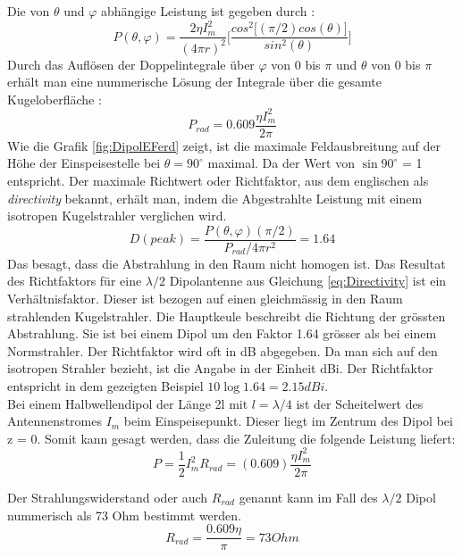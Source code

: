 Die von $\theta$ und $\varphi$ abhängige Leistung ist gegeben durch \cite{elliott1981antenna}:
\begin{equation}
P(\theta,\varphi)=\frac{2\eta I_{m}^{2}}{(4\pi r)^{2}}\lbrack \frac{cos^{2}\lbrack (\pi/2) cos(\theta)\rbrack}{sin^{2}(\theta)}\rbrack
\end{equation}
Durch das Auflösen der Doppelintegrale über $\varphi$ von 0 bis $\pi$  und $\theta$ von 0 bis $\pi$ erhält man eine nummerische Lösung der Integrale über die gesamte Kugeloberfläche \cite{elliott1981antenna}:
\begin{equation}
P_{rad}=0.609 \frac{\eta I_{m}^{2}}{2\pi}
\end{equation}
Wie die  Grafik \ref{fig:DipolEFerd} zeigt, ist die maximale Feldausbreitung auf der Höhe der Einspeisestelle bei $\theta = 90 ^\circ $ maximal.  Da der Wert von  $\sin90^\circ  $ = 1 entspricht.
Der maximale Richtwert oder Richtfaktor,  aus dem englischen als \textit{directivity} bekannt, erhält man, indem die Abgestrahlte Leistung mit einem isotropen Kugelstrahler verglichen wird\cite{elliott1981antenna}.
\begin{equation}
D(peak)=\frac{P(\theta,\varphi)(\pi/2)}{P_{rad}/ 4 \pi r^{2}} =1.64
\label{eq:Directivity}
\end{equation}
Das besagt, dass die Abstrahlung in den Raum nicht homogen ist. Das Resultat des Richtfaktors für eine $\lambda /2$ Dipolantenne aus Gleichung \ref{eq:Directivity} ist ein Verhältnisfaktor. Dieser ist bezogen auf einen gleichmässig in den Raum strahlenden Kugelstrahler. Die Hauptkeule beschreibt die Richtung der grössten Abstrahlung. Sie ist bei einem Dipol um den Faktor 1.64 grösser als bei einem Normstrahler. Der Richtfaktor wird oft in dB abgegeben. Da man sich auf den isotropen Strahler bezieht, ist die Angabe in der Einheit dBi. Der Richtfaktor entspricht in dem gezeigten Beispiel $10\log{1.64}=2.15dBi$.\\

Bei einem Halbwellendipol der Länge 2l mit $l=\lambda/4 $ ist der Scheitelwert des Antennenstromes $I_{m}$ beim Einspeisepunkt. Dieser liegt im Zentrum des Dipol bei z = 0. Somit kann gesagt werden, dass die Zuleitung  die folgende Leistung  liefert:
\begin{equation}
P=\frac{1}{2} I_{m}^{2}R_{rad}=(0.609)\frac{\eta I_{m}^{2}}{2\pi}
\end{equation}

Der Strahlungswiderstand oder auch $R_{rad}$ genannt kann im Fall des $\lambda /2$ Dipol nummerisch als 73 Ohm bestimmt werden.
\begin{equation}\label{RradDipol}
R_{rad}=\frac{0.609 \eta}{\pi}= 73 Ohm
\end{equation}
